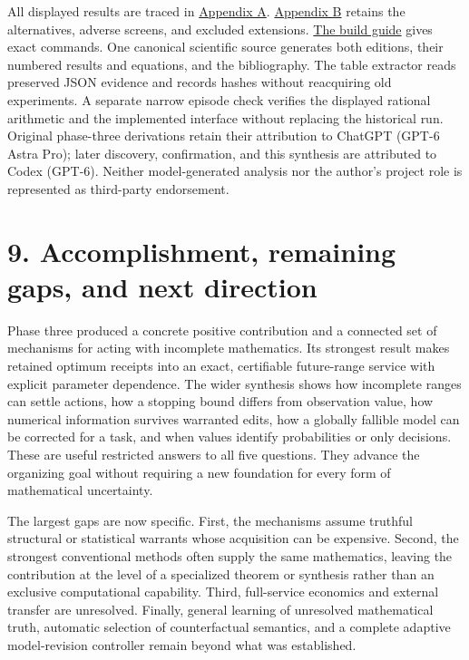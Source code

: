 \documentclass{article}
\theoremstyle{definition}
\begin{document}
All displayed results are traced in
\href{https://github.com/TristanMiano/value_logic/blob/main/v3/report/claims.md}{Appendix
A}.
\href{https://github.com/TristanMiano/value_logic/blob/main/v3/report/portfolio.md}{Appendix
B} retains the alternatives, adverse screens, and excluded extensions.
\href{https://github.com/TristanMiano/value_logic/blob/main/v3/report/README.md}{The
build guide} gives exact commands. One canonical scientific source
generates both editions, their numbered results and equations, and the
bibliography. The table extractor reads preserved JSON evidence and
records hashes without reacquiring old experiments. A separate narrow
episode check verifies the displayed rational arithmetic and the
implemented interface without replacing the historical run. Original
phase-three derivations retain their attribution to ChatGPT (GPT-6 Astra
Pro); later discovery, confirmation, and this synthesis are attributed
to Codex (GPT-6). Neither model-generated analysis nor the author's
project role is represented as third-party endorsement.

\section{9. Accomplishment, remaining gaps, and next
direction}\label{sec-conclusion}

Phase three produced a concrete positive contribution and a connected
set of mechanisms for acting with incomplete mathematics. Its strongest
result makes retained optimum receipts into an exact, certifiable
future-range service with explicit parameter dependence. The wider
synthesis shows how incomplete ranges can settle actions, how a stopping
bound differs from observation value, how numerical information survives
warranted edits, how a globally fallible model can be corrected for a
task, and when values identify probabilities or only decisions. These
are useful restricted answers to all five questions. They advance the
organizing goal without requiring a new foundation for every form of
mathematical uncertainty.

The largest gaps are now specific. First, the mechanisms assume truthful
structural or statistical warrants whose acquisition can be expensive.
Second, the strongest conventional methods often supply the same
mathematics, leaving the contribution at the level of a specialized
theorem or synthesis rather than an exclusive computational capability.
Third, full-service economics and external transfer are unresolved.
Finally, general learning of unresolved mathematical truth, automatic
selection of counterfactual semantics, and a complete adaptive
model-revision controller remain beyond what was established.
\end{document}
